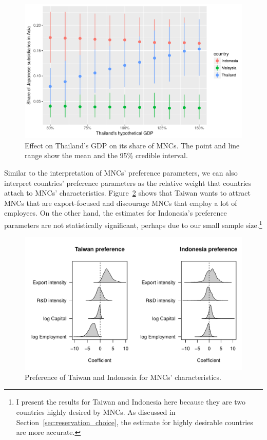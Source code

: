 \begin{figure}[tbp]
  \centering
  \includegraphics[width=\textwidth,keepaspectratio]{../figure/japan96_effect_GDP_on_share_of_MNCs}
  \caption[Effect of Thailand's GDP on its share of MNCs.]{Effect on Thailand's
    GDP on its share of MNCs. The point and line range show the mean and the
    95\% credible interval.}
  \label{fig:japan96_effect_GDP_on_share_of_MNCs}
\end{figure}

Similar to the interpretation of MNCs' preference parameters, we can also
interpret countries' preference parameters as the relative weight that countries
attach to MNCs' characteristics. Figure~\ref{fig:japan96_beta_Taiwan_Indonesia}
shows that Taiwan wants to attract MNCs that are export-focused and discourage
MNCs that employ a lot of employees. On the other hand, the estimates for
Indonesia's preference parameters are not statistically significant, perhaps due
to our small sample size.\footnote{I present the results for Taiwan and
  Indonesia here because they are two countries highly desired by MNCs. As
  discussed in Section~\ref{sec:reservation_choice}, the estimate for highly
  desirable countries are more accurate.}

\begin{figure}[tbp]
  \centering
  \includegraphics[width=\textwidth,keepaspectratio]{../figure/japan96_beta_Taiwan_Indonesia}
  \caption[Preference of Taiwan and Indonesia.]{Preference of Taiwan and Indonesia for MNCs' characteristics.}
  \label{fig:japan96_beta_Taiwan_Indonesia}
\end{figure}

